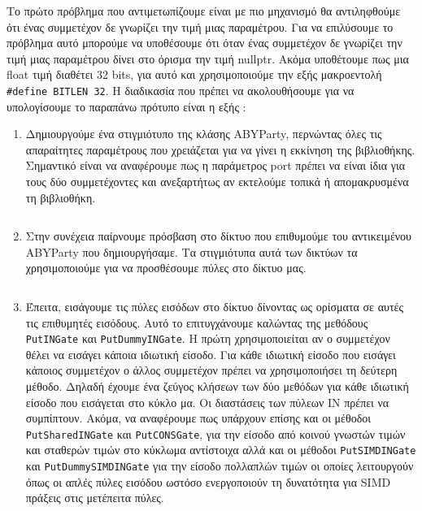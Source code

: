 Το πρώτο πρόβλημα που αντιμετωπίζουμε είναι με πιο μηχανισμό θα αντιληφθούμε ότι ένας συμμετέχον δε γνωρίζει την τιμή μιας παραμέτρου. Για να επιλύσουμε το πρόβλημα αυτό μπορούμε να υποθέσουμε ότι όταν ένας συμμετέχον δε γνωρίζει την τιμή μιας παραμέτρου δίνει στο όρισμα την τιμή nullptr. Ακόμα υποθέτουμε πως μια float τιμή διαθέτει 32 bits, για αυτό και χρησιμοποιούμε την εξής μακροεντολή \texttt{#define BITLEN 32}. Η διαδικασία που πρέπει να ακολουθήσουμε για να υπολογίσουμε το παραπάνω πρότυπο είναι η εξής :

\begin{enumerate}
    \item Δημιουργούμε ένα στιγμιότυπο της κλάσης ABYParty, περνώντας όλες τις απαραίτητες παραμέτρους που χρειάζεται για να γίνει η εκκίνηση της βιβλιοθήκης. Σημαντικό είναι να αναφέρουμε πως η παράμετρος port πρέπει να είναι ίδια για τους δύο συμμετέχοντες και ανεξαρτήτως αν εκτελούμε τοπικά ή απομακρυσμένα τη βιβλιοθήκη.
    \begin{longlisting}
        \begin{center}
            \inputminted[fontsize=\scriptsize,frame=single]{cpp}{./01_body/code/aby-example-step-1.cpp}
        \end{center}
    \end{longlisting}
    \item Στην συνέχεια παίρνουμε πρόσβαση στο δίκτυο που επιθυμούμε του αντικειμένου ABYParty που δημιουργήσαμε. Τα στιγμιότυπα αυτά των δικτύων τα χρησιμοποιούμε για να προσθέσουμε πύλες στο δίκτυο μας.
    \begin{longlisting}
        \begin{center}
          \inputminted[fontsize=\scriptsize,frame=single]{cpp}{./01_body/code/aby-example-step-2.cpp}
        \end{center}
    \end{longlisting}
    \item Έπειτα, εισάγουμε τις πύλες εισόδων στο δίκτυο δίνοντας ως ορίσματα σε αυτές τις επιθυμητές εισόδους. Αυτό το επιτυγχάνουμε καλώντας της μεθόδους \texttt{PutINGate} και \texttt{PutDummyINGate}. Η πρώτη χρησιμοποιείται αν ο συμμετέχον θέλει να εισάγει κάποια ιδιωτική είσοδο. Για κάθε ιδιωτική είσοδο που εισάγει κάποιος συμμετέχον ο άλλος συμμετέχον πρέπει να χρησιμοποιήσει τη δεύτερη μέθοδο. Δηλαδή έχουμε ένα ζεύγος κλήσεων των δύο μεθόδων για κάθε ιδιωτική είσοδο που εισάγεται στο κύκλο μα. Οι διαστάσεις των πύλεων IN πρέπει να συμπίπτουν. Ακόμα, να αναφέρουμε πως υπάρχουν επίσης και οι μέθοδοι \texttt{PutSharedINGate} και \texttt{PutCONSGate}, για την είσοδο από κοινού γνωστών τιμών και σταθερών τιμών στο κύκλωμα αντίστοιχα αλλά και οι μέθοδοι \texttt{PutSIMDINGate} και \texttt{PutDummySIMDINGate} για την είσοδο πολλαπλών τιμών οι οποίες λειτουργούν όπως οι απλές πύλες εισόδου ωστόσο ενεργοποιούν τη δυνατότητα για SIMD πράξεις στις μετέπειτα πύλες.

\end{enumerate}
